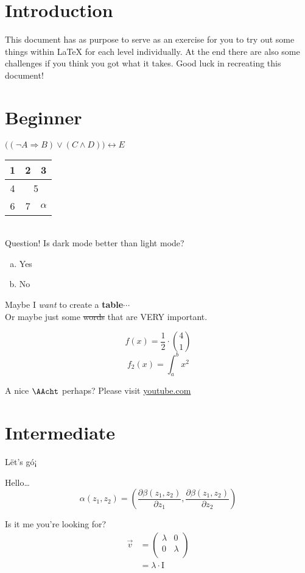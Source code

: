 \documentclass[hidelinks]{article}
\begin{document}
\section*{Introduction}
This document has as purpose to serve as an exercise for you to try out some things within \LaTeX\; for each level individually. At the end there are also some challenges if you think you got what it takes. Good luck in recreating this document!

\clearpage

\section*{Beginner}
$\Big((\neg A\Rightarrow B) \vee (C \wedge D)\Big) \leftrightarrow E $

\begin{tabular}{| c c c |}
1 & 2 & 3\\
\hline
4 & \multicolumn{2}{c|}{5} \\
6 & 7 & $\alpha$
\end{tabular}\\

Question! Is dark mode better than light mode?
\begin{enumerate}[a)]
	\item Yes
	\item No
\end{enumerate}

Maybe I \textit{want} to create a \textbf{table}$\cdots$\\

Or maybe \qquad just \qquad some \st{words} that are {\Huge VERY} important.

\[f(x) = \frac{1}{2}\cdot\binom{4}{1}\]
\[f_{2}(x) = \int_{a}^{b}x^2\]

A nice $\AAcht$ perhaps? Please visit \url{youtube.com}

\clearpage

\section*{Intermediate}
L\"{e}t's g\'{o}¡\\[5mm]
\begin{minipage}{0.5\textwidth}
Hello\dots
\begin{equation*}
	\alpha(z_{1}, z_{2}) = \left(\dfrac{\partial\beta(z_{1}, z_{2})}{\partial z_{1}}, \dfrac{\partial\beta(z_{1}, z_{2})}{\partial z_{2}}\right)
\end{equation*}
\vfill
\end{minipage}
\begin{minipage}{0.5\textwidth}
Is it me you're looking for?
\begin{align*}
\vec{v} &= 
\begin{pmatrix}
	\lambda & 0 \\
	0 & \lambda \\
\end{pmatrix}
\\
&= \lambda\cdot \text{I}
\end{align*}
\end{minipage}
\end{document}
